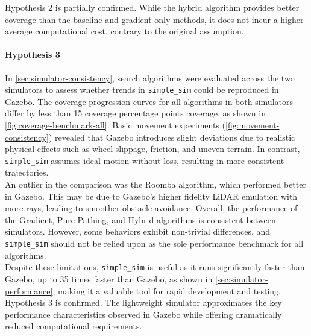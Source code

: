 Hypothesis 2 is partially confirmed. While the hybrid algorithm provides better coverage than the baseline and gradient-only methods, it does not incur a higher average computational cost, contrary to the original assumption.

\paragraph{Hypothesis 3}
In \cref{sec:simulator-consistency}, search algorithms were evaluated across the two simulators to assess whether trends in \texttt{simple\_sim} could be reproduced in Gazebo. The coverage progression curves for all algorithms in both simulators differ by less than 15 coverage percentage points coverage, as shown in \cref{fig:coverage-benchmark-all}. Basic movement experiments (\cref{fig:movement-consistency}) revealed that Gazebo introduces slight deviations due to realistic physical effects such as wheel slippage, friction, and uneven terrain. In contrast, \texttt{simple\_sim} assumes ideal motion without loss, resulting in more consistent trajectories. \\

An outlier in the comparison was the Roomba algorithm, which performed better in Gazebo. This may be due to Gazebo’s higher fidelity LiDAR emulation with more rays, leading to smoother obstacle avoidance. Overall, the performance of the Gradient, Pure Pathing, and Hybrid algorithms is consistent between simulators. However, some behaviors exhibit non-trivial differences, and \texttt{simple\_sim} should not be relied upon as the sole performance benchmark for all algorithms. \\

Despite these limitations, \texttt{simple\_sim} is useful as it runs significantly faster than Gazebo, up to 35 times faster than Gazebo, as shown in \cref{sec:simulator-performance}, making it a valuable tool for rapid development and testing. \\

Hypothesis 3 is confirmed. The lightweight simulator approximates the key performance characteristics observed in Gazebo while offering dramatically reduced computational requirements.
